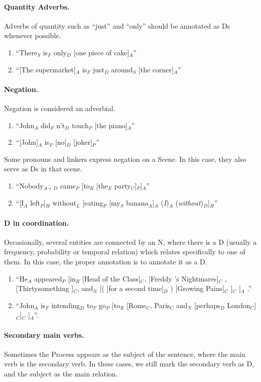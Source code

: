 \documentclass[11pt]{article}
\newcommand{\be}{\begin{enumerate}}
\newcommand{\ee}{\end{enumerate}}
\newcommand{\dout}[1]{}
\newcommand{\rem}[1]{{(\it #1})}
\begin{document}
\paragraph{Quantity Adverbs.} Adverbs of quantity such as ``just'' and ``only'' should be annotated as Ds whenever possible.
\be \item
``There$_S$ is$_F$ only$_D$ [one piece of cake]$_A$''
\item
``[The supermarket]$_A$ is$_F$ just$_D$ around$_S$ [the corner]$_A$''
\ee


\paragraph{Negation.} Negation is considered an adverbial.
\be \item
``John$_A$ did$_F$ n't$_D$ touch$_P$ [the piano]$_A$''
\item
``[John]$_A$ is$_F$ [no]$_D$ [joker]$_P$''
\ee


Some pronouns and linkers express negation on a Scene. In this case, they also serve as Ds in that scene.
    
    \be
      \item
      ``Nobody$_{A+D}$ came$_P$ [to$_R$ [the$_E$ party$_C$]$_P$]$_A$''
      \item
   	``[I$_A$ left$_P$]$_H$ without$_{L}$ [eating$_P$ [my$_S$ banana$_A$]$_A$ \rem{I}$_A$ \rem{without}$_D$]$_H$''  
    \ee

\paragraph{D in coordination.} Occasionally, several entities are connected by an N, where there is a D (usually a frequency, probability or temporal relation) which relates specifically to one of them. In this case, the proper annotation is to annotate it as a D.
\be
\item
``He$_A$ appeared$_P$ [in$_R$ [Head of the Class]$_C$, [Freddy 's Nightmares]$_C$ , [Thirtysomething ]$_C$, and$_N$ [( [for a second time]$_D$ ) [Growing Pains]$_C$ ]$_C$ ]$_A$ .''
\item
``John$_A$ is$_F$ intending$_D$ to$_F$ go$_P$ [to$_R$ [Rome$_C$, Paris$_C$ and$_N$ [perhaps$_D$ London$_C$]$_C$]$_C$ ]$_A$''.
\dout{\item
``They$_A$ treated$_P$ us$_A$ [like$_R$ people$_C$ [not$_D$ dogs$_C$ ]''
}
\ee

\paragraph {Secondary main verbs.} Sometimes the Process appears as the subject of the sentence, 
where the main verb is the secondary verb. In these cases, we still mark the secondary verb as D, and the subject as the main relation.
\end{document}
